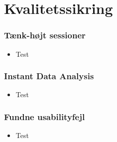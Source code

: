 \section{Kvalitetssikring}

\begin{frame}
	\frametitle{Tænk-højt sessioner}
  \begin{itemize}
	  \item Test
  \end{itemize}
\end{frame}

\begin{frame}
	\frametitle{Instant Data Analysis}
  \begin{itemize}
	  \item Test
  \end{itemize}
\end{frame}

\begin{frame}
	\frametitle{Fundne usabilityfejl}
    \begin{itemize}
	  \item Test
  \end{itemize}
\end{frame}